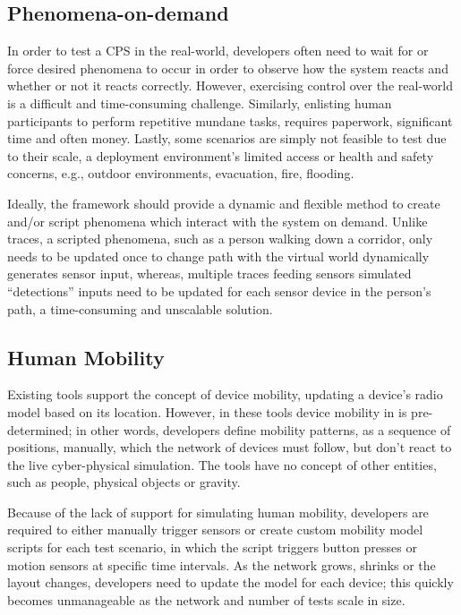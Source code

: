 \subsection{Phenomena-on-demand}
\label{sub:requirements_Phenomena-on-demand}
In order to test a CPS in the real-world, developers often need to wait for or force desired phenomena to occur in order to observe how the system reacts and whether or not it reacts correctly. However, exercising control over the real-world is a difficult and time-consuming challenge. Similarly, enlisting human participants to perform repetitive mundane tasks, requires paperwork, significant time and often money. Lastly, some scenarios are simply not feasible to test due to their scale, a deployment environment's limited access or health and safety concerns, e.g., outdoor environments, evacuation, fire, flooding.

Ideally, the framework should provide a dynamic and flexible method to create and/or script phenomena which interact with the system on demand. Unlike traces, a scripted phenomena, such as a person walking down a corridor, only needs to be updated once to change path with the virtual world dynamically generates sensor input, whereas, multiple traces feeding sensors simulated ``detections'' inputs need to be updated for each sensor device in the person's path, a time-consuming and unscalable solution.


\subsection{Human Mobility} %
\label{sub:requirements_mobility}
Existing tools support the concept of device mobility, updating a device's radio model based on its location. However, in these tools device mobility in is pre-determined; in other words, developers define mobility patterns, as a sequence of positions, manually, which the network of devices must follow, but don't react to the live cyber-physical simulation. The tools have no concept of other entities, such as people, physical objects or gravity.

Because of the lack of support for simulating human mobility, developers are required to either manually trigger sensors or create custom mobility model scripts for each test scenario, in which the script triggers button presses or motion sensors at specific time intervals. As the network grows, shrinks or the layout changes, developers need to update the model for each device; this quickly becomes unmanageable as the network and number of tests scale in size.


